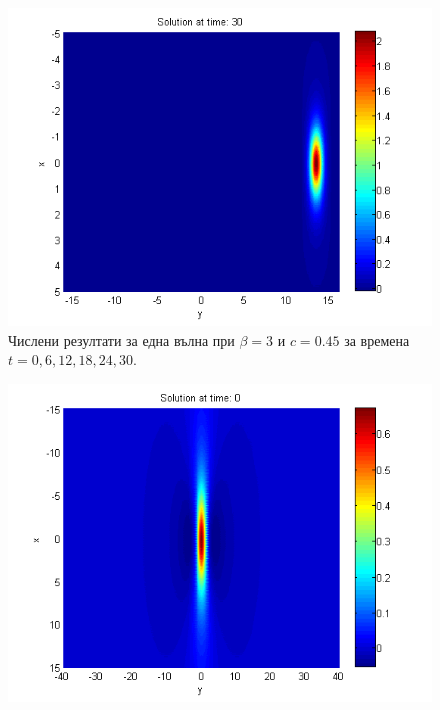 \documentclass[a4paper]{article}
\theoremstyle{remark}
\begin{document}
\begin{large}
\begin{figure}[ht]
\begin{minipage}[b]{0.48\linewidth}
		 \includegraphics[width=\linewidth]{../amitans/figures/solution_30x45_bt3_c045_T30.png}
	\end{minipage}
\caption{Числени резултати за една вълна при $\beta=3$ и $c = 0.45$ за времена $t=0,6,12,18,24,30$.}
\label{Wave1}
\end{figure}
\FloatBarrier
\begin{figure}[ht]\vspace{0.2cm}
\centering
	\begin{minipage}[b]{0.48\linewidth}
		\includegraphics[width=\linewidth]{../amitans/figures/solution_128x90_bt1_c090_T0.png}
	\end{minipage}	
	\begin{minipage}[b]{0.48\linewidth}

\end{minipage}
\end{figure}
\end{large}
\end{document}
